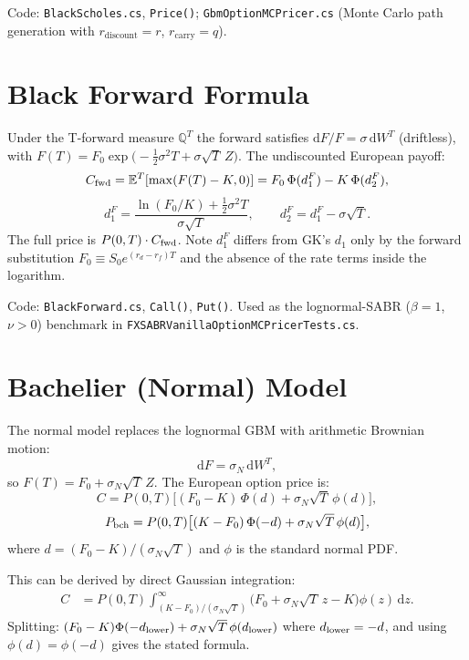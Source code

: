 \documentclass[11pt,a4paper]{article}
\newcommand{\dd}{\mathrm{d}}
\newcommand{\E}{\mathbb{E}}
\newcommand{\QT}{\mathbb{Q}^T}
\newcommand{\coderef}[1]{\texttt{\color{blue!60!black}#1}}
\theoremstyle{definition}
\begin{document}
Code: \coderef{BlackScholes.cs}, \texttt{Price()};
\coderef{GbmOptionMCPricer.cs} (Monte Carlo path generation with
$r_{\mathrm{discount}}=r$, $r_{\mathrm{carry}}=q$).

\section{Black Forward Formula}
\label{sec:black_fwd}

Under the T-forward measure $\QT$ the forward satisfies $\dd F/F=\sigma\,\dd W^T$
(driftless), with $F(T)=F_0\exp\bigl(-\tfrac{1}{2}\sigma^2 T+\sigma\sqrt{T}\,Z\bigr)$.
The undiscounted European payoff:
\[
  C_{\rm fwd} = \E^T[\max(F(T)-K,0)]
              = F_0\,\Phi(d_1^F) - K\,\Phi(d_2^F),
\]
\[
  d_1^F = \frac{\ln(F_0/K)+\tfrac{1}{2}\sigma^2 T}{\sigma\sqrt{T}},
  \qquad d_2^F = d_1^F - \sigma\sqrt{T}.
\]
The full price is $P(0,T)\cdot C_{\rm fwd}$.  Note $d_1^F$ differs from
GK's $d_1$ only by the forward substitution $F_0\equiv S_0 e^{(r_d-r_f)T}$ and
the absence of the rate terms inside the logarithm.

Code: \coderef{BlackForward.cs}, \texttt{Call()}, \texttt{Put()}.
Used as the lognormal-SABR ($\beta=1$, $\nu>0$) benchmark in
\coderef{FXSABRVanillaOptionMCPricerTests.cs}.

\section{Bachelier (Normal) Model}
\label{sec:bachelier}

The normal model replaces the lognormal GBM with arithmetic Brownian motion:
\[
  \dd F = \sigma_N\,\dd W^T,
\]
so $F(T) = F_0 + \sigma_N\sqrt{T}\,Z$.  The European option price is:
\[
  \boxed{C = P(0,T)\bigl[(F_0-K)\,\Phi(d) + \sigma_N\sqrt{T}\,\phi(d)\bigr],}
\]
\[
  P_{\rm bch} = P(0,T)\bigl[(K-F_0)\,\Phi(-d) + \sigma_N\sqrt{T}\,\phi(d)\bigr],
\]
where $d=(F_0-K)/(\sigma_N\sqrt{T})$ and $\phi$ is the standard normal PDF.

This can be derived by direct Gaussian integration:
\begin{align*}
  C &= P(0,T)\int_{(K-F_0)/(\sigma_N\sqrt{T})}^{\infty}
       \bigl(F_0+\sigma_N\sqrt{T}\,z-K\bigr)\phi(z)\,\dd z.
\end{align*}
Splitting: $(F_0-K)\Phi(-d_{\rm lower})+\sigma_N\sqrt{T}\,\phi(d_{\rm lower})$
where $d_{\rm lower}=-d$, and using $\phi(d)=\phi(-d)$ gives the stated formula.
\end{document}
